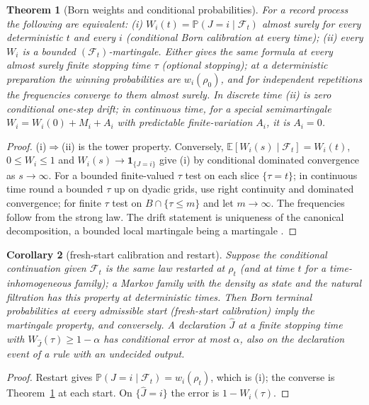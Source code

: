 \documentclass[aps,pra,onecolumn,superscriptaddress,nofootinbib,10pt]{revtex4-2}
\newtheorem{theorem}{Theorem}
\newtheorem{corollary}[theorem]{Corollary}
\theoremstyle{definition}
\theoremstyle{remark}
\begin{document}
\begin{theorem}[Born weights and conditional probabilities]\label{thm:sorigidity}
For a record process the following are equivalent:
(i) $W_i(t)=\mathbb P(J=i\mid\mathcal F_t)$ almost surely for every deterministic $t$ and every $i$ (conditional Born
calibration at every time); (ii) every $W_i$ is a bounded $(\mathcal F_t)$-martingale.
Either gives the same formula at every almost surely finite stopping time $\tau$ (optional stopping); at
a deterministic preparation the winning probabilities are $w_i(\rho_0)$, and for independent repetitions the
frequencies converge to them almost surely.  In discrete time (ii) is zero conditional one-step drift; in
continuous time, for a special semimartingale $W_i=W_i(0)+M_i+A_i$ with predictable finite-variation $A_i$, it is $A_i=0$.
\end{theorem}
\begin{proof}
(i)$\Rightarrow$(ii) is the tower property.  Conversely, $\mathbb E[W_i(s)\mid\mathcal F_t]=W_i(t)$, $0\le W_i\le1$ and $W_i(s)\to\mathbf1_{\{J=i\}}$ give (i)
by conditional dominated convergence as $s\to\infty$.  For a bounded finite-valued $\tau$ test on each slice $\{\tau=t\}$;
in continuous time round a bounded $\tau$ up on dyadic grids, use right continuity and dominated
convergence; for finite $\tau$ test on $B\cap\{\tau\le m\}$ and let $m\to\infty$.  The frequencies follow from the strong
law.  The drift statement is uniqueness of the canonical decomposition, a bounded local martingale
being a martingale \cite{n3:Williams}.
\end{proof}

\begin{corollary}[fresh-start calibration and restart]\label{cor:sorestart}
Suppose the conditional continuation given $\mathcal F_t$ is the same law restarted at $\rho_t$ (and at time $t$ for a
time-inhomogeneous family); a Markov family with the density as state and the natural filtration has this
property at deterministic times.  Then Born terminal probabilities at every admissible start (fresh-start
calibration) imply the martingale property, and conversely.  A declaration $\hat J$ at a finite stopping time
with $W_{\hat J}(\tau)\ge1-\alpha$ has conditional error at most $\alpha$, also on the declaration event of a rule with an
undecided output.
\end{corollary}
\begin{proof}
Restart gives $\mathbb P(J=i\mid\mathcal F_t)=w_i(\rho_t)$, which is (i); the converse is Theorem~\ref{thm:sorigidity} at each start.  On
$\{\hat J=i\}$ the error is $1-W_i(\tau)$.
\end{proof}
\end{document}
